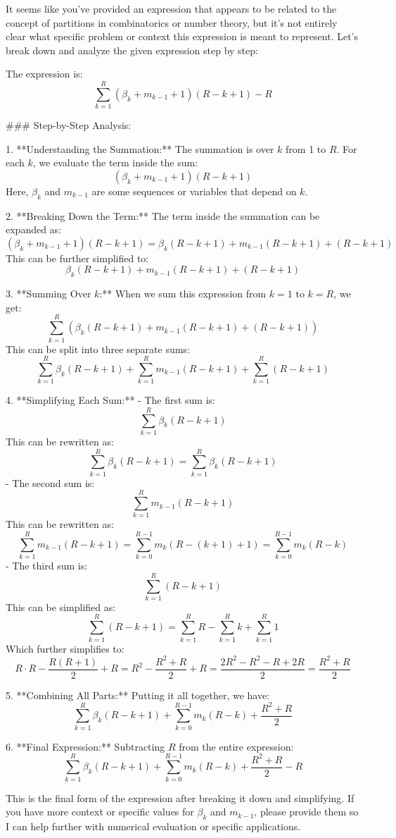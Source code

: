 It seems like you've provided an expression that appears to be related to the concept of partitions in combinatorics or number theory, but it's not entirely clear what specific problem or context this expression is meant to represent. Let's break down and analyze the given expression step by step:

The expression is:
\[
\sum_{k=1}^{R} (\beta_k + m_{k-1} + 1)(R - k + 1) - R
\]

### Step-by-Step Analysis:

1. **Understanding the Summation:**
   The summation is over \( k \) from 1 to \( R \). For each \( k \), we evaluate the term inside the sum:
   \[
   (\beta_k + m_{k-1} + 1)(R - k + 1)
   \]
   Here, \( \beta_k \) and \( m_{k-1} \) are some sequences or variables that depend on \( k \).

2. **Breaking Down the Term:**
   The term inside the summation can be expanded as:
   \[
   (\beta_k + m_{k-1} + 1)(R - k + 1) = \beta_k (R - k + 1) + m_{k-1} (R - k + 1) + (R - k + 1)
   \]
   This can be further simplified to:
   \[
   \beta_k (R - k + 1) + m_{k-1} (R - k + 1) + (R - k + 1)
   \]

3. **Summing Over \( k \):**
   When we sum this expression from \( k = 1 \) to \( k = R \), we get:
   \[
   \sum_{k=1}^{R} \left( \beta_k (R - k + 1) + m_{k-1} (R - k + 1) + (R - k + 1) \right)
   \]
   This can be split into three separate sums:
   \[
   \sum_{k=1}^{R} \beta_k (R - k + 1) + \sum_{k=1}^{R} m_{k-1} (R - k + 1) + \sum_{k=1}^{R} (R - k + 1)
   \]

4. **Simplifying Each Sum:**
   - The first sum is:
     \[
     \sum_{k=1}^{R} \beta_k (R - k + 1)
     \]
     This can be rewritten as:
     \[
     \sum_{k=1}^{R} \beta_k (R - k + 1) = \sum_{k=1}^{R} \beta_k (R - k + 1)
     \]
   - The second sum is:
     \[
     \sum_{k=1}^{R} m_{k-1} (R - k + 1)
     \]
     This can be rewritten as:
     \[
     \sum_{k=1}^{R} m_{k-1} (R - k + 1) = \sum_{k=0}^{R-1} m_k (R - (k+1) + 1) = \sum_{k=0}^{R-1} m_k (R - k)
     \]
   - The third sum is:
     \[
     \sum_{k=1}^{R} (R - k + 1)
     \]
     This can be simplified as:
     \[
     \sum_{k=1}^{R} (R - k + 1) = \sum_{k=1}^{R} R - \sum_{k=1}^{R} k + \sum_{k=1}^{R} 1
     \]
     Which further simplifies to:
     \[
     R \cdot R - \frac{R(R+1)}{2} + R = R^2 - \frac{R^2 + R}{2} + R = \frac{2R^2 - R^2 - R + 2R}{2} = \frac{R^2 + R}{2}
     \]

5. **Combining All Parts:**
   Putting it all together, we have:
   \[
   \sum_{k=1}^{R} \beta_k (R - k + 1) + \sum_{k=0}^{R-1} m_k (R - k) + \frac{R^2 + R}{2}
   \]

6. **Final Expression:**
   Subtracting \( R \) from the entire expression:
   \[
   \sum_{k=1}^{R} \beta_k (R - k + 1) + \sum_{k=0}^{R-1} m_k (R - k) + \frac{R^2 + R}{2} - R
   \]

This is the final form of the expression after breaking it down and simplifying. If you have more context or specific values for \( \beta_k \) and \( m_{k-1} \), please provide them so I can help further with numerical evaluation or specific applications.